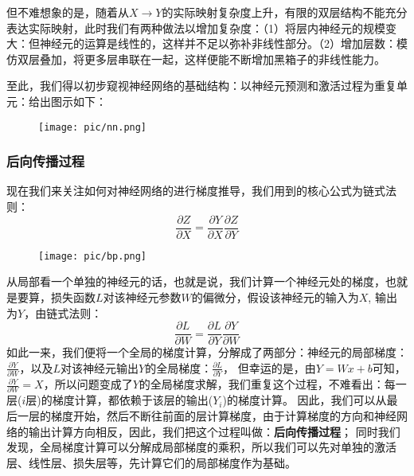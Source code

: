 \documentclass{ctexart}
\begin{document}
                但不难想象的是，随着从$X\rightarrow Y$的实际映射复杂度上升，有限的双层结构不能充分表达实际映射，此时我们有两种做法以增加复杂度：（1）将层内神经元的规模变大：但神经元的运算是线性的，这样并不足以弥补非线性部分。（2）增加层数：模仿双层叠加，将更多层串联在一起，这样便能不断增加黑箱子的非线性能力。
                
                至此，我们得以初步窥视神经网络的基础结构：以神经元预测和激活过程为重复单元：给出图示如下：
                \begin{figure}[H]
                    \texttt{[image: pic/nn.png]}
                \end{figure}

                \subsubsection{后向传播过程}
                    现在我们来关注如何对神经网络的进行梯度推导，我们用到的核心公式为链式法则：
                    \begin{equation}
                        \frac{\partial Z}{\partial X} = \frac{\partial Y}{\partial X} \frac{\partial Z}{\partial Y}  
                    \end{equation}
                    \begin{figure}[H]
                        \texttt{[image: pic/bp.png]}
                    \end{figure}
                    从局部看一个单独的神经元的话，也就是说，我们计算一个神经元处的梯度，也就是要算，损失函数$L$对该神经元参数$W$的偏微分，假设该神经元的输入为$X$, 输出为$Y$，由链式法则：
                    \begin{equation}
                        \frac{\partial L}{\partial W} = \frac{\partial L}{\partial Y} \frac{\partial Y}{\partial W}
                    \end{equation}
                    如此一来，我们便将一个全局的梯度计算，分解成了两部分：神经元的局部梯度：$\frac{\partial Y}{\partial W}$，以及$L$对该神经元输出$Y$的全局梯度：$\frac{\partial L}{\partial Y}$，
                    但幸运的是，由$Y=Wx+b$可知，$\frac{\partial Y}{\partial W} = X$，所以问题变成了$Y$的全局梯度求解，我们重复这个过程，不难看出：每一层($i$层)的梯度计算，都依赖于该层的输出($Y_i$)的梯度计算。
                    因此，我们可以从最后一层的梯度开始，然后不断往前面的层计算梯度，由于计算梯度的方向和神经网络的输出计算方向相反，因此，我们把这个过程叫做：\textbf{后向传播过程}；
                    同时我们发现，全局梯度计算可以分解成局部梯度的乘积，所以我们可以先对单独的激活层、线性层、损失层等，先计算它们的局部梯度作为基础。
\end{document}
